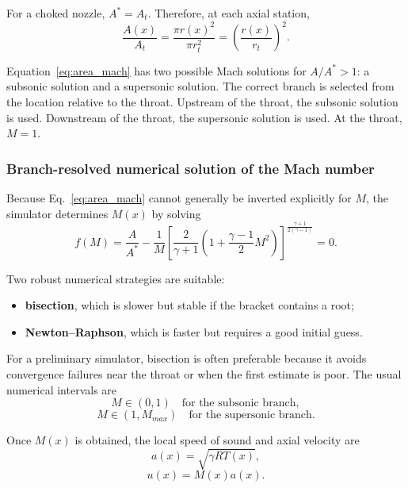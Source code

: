 \documentclass[11pt,a4paper]{article}
\begin{document}
For a choked nozzle, $A^*=A_t$. Therefore, at each axial station,
\begin{equation}
\frac{A(x)}{A_t}=\frac{\pi r(x)^2}{\pi r_t^2}=\left(\frac{r(x)}{r_t}\right)^2 .
\label{eq:area_ratio_local}
\end{equation}

Equation~\eqref{eq:area_mach} has two possible Mach solutions for $A/A^*>1$: a subsonic solution and a supersonic solution. The correct branch is selected from the location relative to the throat. Upstream of the throat, the subsonic solution is used. Downstream of the throat, the supersonic solution is used. At the throat, $M=1$.

\subsubsection{Branch-resolved numerical solution of the Mach number}

Because Eq.~\eqref{eq:area_mach} cannot generally be inverted explicitly for $M$, the simulator determines $M(x)$ by solving
\begin{equation}
f(M)=\frac{A}{A^*} - \frac{1}{M}
\left[
\frac{2}{\gamma+1}
\left(1+\frac{\gamma-1}{2}M^2\right)
\right]^{\frac{\gamma+1}{2(\gamma-1)}}=0 .
\label{eq:area_mach_residual}
\end{equation}

Two robust numerical strategies are suitable:
\begin{itemize}
    \item \textbf{bisection}, which is slower but stable if the bracket contains a root;
    \item \textbf{Newton--Raphson}, which is faster but requires a good initial guess.
\end{itemize}

For a preliminary simulator, bisection is often preferable because it avoids convergence failures near the throat or when the first estimate is poor. The usual numerical intervals are
\begin{equation}
M\in(0,1) \quad \text{for the subsonic branch},
\end{equation}
\begin{equation}
M\in(1,M_{max}) \quad \text{for the supersonic branch}.
\end{equation}

Once $M(x)$ is obtained, the local speed of sound and axial velocity are
\begin{equation}
a(x)=\sqrt{\gamma R T(x)},
\end{equation}
\begin{equation}
u(x)=M(x)a(x).
\label{eq:velocity}
\end{equation}
\end{document}
